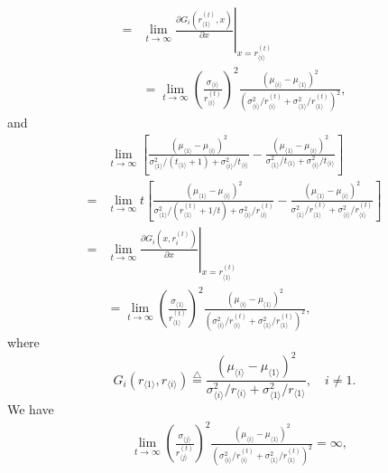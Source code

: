 \documentclass[journal]{IEEEtran}
\newcommand{\ed}{\stackrel{\triangle}{=}}
\begin{document}
\begin{IEEEproof}
\begin{align*}
    =& \lim_{t\to\infty}\left.\frac{\partial G_i(r^{(t)}_{\langle 1 \rangle},x)}{\partial x}\right|_{x=r_{\langle i \rangle}^{(t)}}\\
    &=\lim_{t\to\infty} \left(\frac{\sigma_{\langle i \rangle}}{r_{\langle i \rangle}^{(t)}}\right)^2 \frac{(\mu_{\langle i \rangle}-\mu_{\langle 1 \rangle})^2}{\left(\sigma_{\langle i \rangle}^2/r_{\langle i \rangle}^{(t)}+\sigma_{\langle 1 \rangle}^2/r_{\langle 1 \rangle}^{(t)}\right)^2},
    \end{align*}
    and 
     \begin{align*}
     &\lim_{t\to\infty}\left[\frac{\left(\mu_{\langle 1 \rangle}-\mu_{\langle i \rangle}\right)^2}{\sigma_{\langle 1 \rangle}^2/(t_{\langle 1 \rangle}+1)+\sigma_{\langle i \rangle}^2/t_{\langle i \rangle}}-\frac{\left(\mu_{\langle 1 \rangle}-\mu_{\langle i \rangle}\right)^2}{\sigma_{\langle 1 \rangle}^2/t_{\langle 1 \rangle}+\sigma_{\langle i \rangle}^2/t_{\langle i \rangle}}\right]\\
     =&\lim_{t\to\infty}t\left[\frac{\left(\mu_{\langle 1 \rangle}-\mu_{\langle i \rangle}\right)^2}{\sigma_{\langle 1 \rangle}^2/\left(r^{(t)}_{\langle 1 \rangle}+1/t\right)+\sigma_{\langle i \rangle}^2/r^{(t)}_{\langle i \rangle}}-\frac{\left(\mu_{\langle 1 \rangle}-\mu_{\langle i \rangle}\right)^2}{\sigma_{\langle 1 \rangle}^2/r^{(t)}_{\langle 1 \rangle}+\sigma_{\langle i \rangle}^2/r^{(t)}_{\langle i \rangle}}\right]\\
     =& \lim_{t\to\infty}\left.\frac{\partial G_i(x,r^{(t)}_{i})}{\partial x}\right|_{x=r_{\langle 1 \rangle}^{(t)}}\\  
     &=\lim_{t\to\infty} \left(\frac{\sigma_{\langle 1 \rangle}}{r_{\langle 1 \rangle}^{(t)}}\right)^2 \frac{(\mu_{\langle i \rangle}-\mu_{\langle 1 \rangle})^2}{\left(\sigma_{\langle i \rangle}^2/r_{\langle i \rangle}^{(t)}+\sigma_{\langle 1 \rangle}^2/r_{\langle 1 \rangle}^{(t)}\right)^2},
     \end{align*}
    where 
    $$G_i(r_{\langle 1 \rangle},r_{\langle i \rangle})\ed\frac{(\mu_{\langle i \rangle}-\mu_{\langle 1 \rangle})^2}{\sigma_{\langle i \rangle}^2/r_{\langle i \rangle}+\sigma_{\langle 1 \rangle}^2/r_{\langle 1 \rangle}},\quad i\neq 1.$$
    We have 
    \begin{align*}&\lim_{t\to\infty} \left(\frac{\sigma_{\langle j\rangle}}{r_{\langle j\rangle}^{(t)}}\right)^2 \frac{(\mu_{\langle i \rangle}-\mu_{\langle 1 \rangle})^2}{\left(\sigma_{\langle i \rangle}^2/r_{\langle i \rangle}^{(t)}+\sigma_{\langle 1 \rangle}^2/r_{\langle 1 \rangle}^{(t)}\right)^2}=\infty,\\

\end{align*}
\end{IEEEproof}
\end{document}
